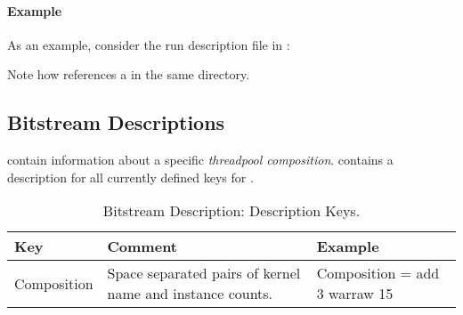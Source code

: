 \paragraph{Example}
As an example, consider the run description file  in :
%

%
Note how  references a  in the same directory.

\subsection{Bitstream Descriptions}
 contain information about a specific \emph{threadpool composition}.
 contains a description for all currently defined keys for .

\begin{longtable}[c]{>{\sffamily}L{0.2\textwidth}L{0.35\textwidth}>{\ttfamily\footnotesize}L{.35\textwidth}}
  \caption{Bitstream Description: Description Keys.}
  \label{tbl:bitstream-description}\\
  \toprule
  \normalfont\normalsize\textbf{Key} & \textbf{Comment} & \normalfont\normalsize\textbf{Example} \\\midrule
  \endhead
  \bottomrule
  \endlastfoot
  Composition & Space separated pairs of kernel name and instance counts. & Composition = add 3 warraw 15 \\
\end{longtable}

